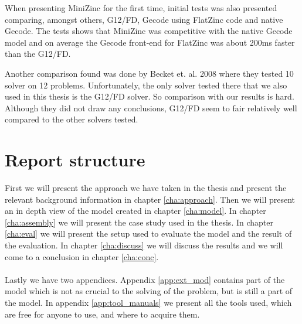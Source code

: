 When presenting MiniZinc for the first time, initial tests was also presented comparing, amongst others, G12/FD, Gecode using FlatZinc code and native Gecode. The tests shows that MiniZinc was competitive with the native Gecode model and on average the Gecode front-end for FlatZinc was about 200ms faster than the G12/FD.\cite{mz_paper}

Another comparison found was done by Becket et. al. 2008 where they tested 10 solver on 12 problems. Unfortunately, the only solver tested there that we also used in this thesis is the G12/FD solver. So comparison with our results is hard. Although they did not draw any conclusions, G12/FD seem to fair relatively well compared to the other solvers tested.\cite{nicta_2964}


\section{Report structure}
First we will present the approach we have taken in the thesis and present the relevant background information in chapter \ref{cha:approach}. Then we will present an in depth view of the model created in chapter \ref{cha:model}. In chapter \ref{cha:assembly} we will present the case study used in the thesis. In chapter \ref{cha:eval} we will present the setup used to evaluate the model and the result of the evaluation. In chapter \ref{cha:discuss} we will discuss the results and we will come to a conclusion in chapter \ref{cha:conc}.
\\\\
Lastly we have two appendices. Appendix \ref{app:ext_mod} contains part of the model which is not as crucial to the solving of the problem, but is still a part of the model. In appendix \ref{app:tool_manuals} we present all the tools used, which are free for anyone to use, and where to acquire them.
